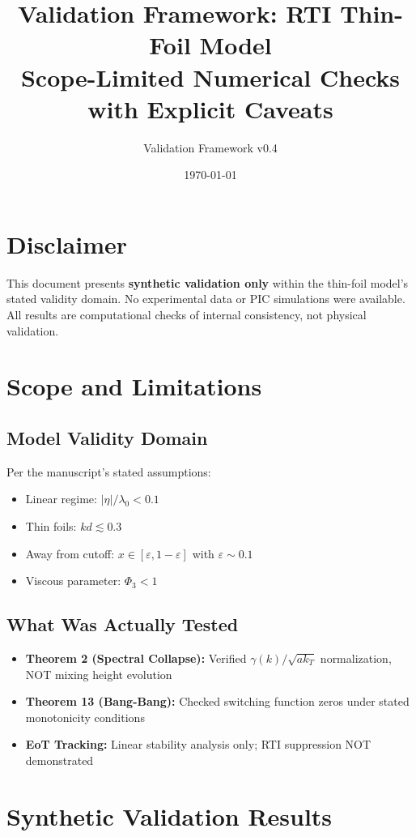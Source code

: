 \documentclass[11pt]{article}
\title{Validation Framework: RTI Thin-Foil Model\\[2pt]
\large Scope-Limited Numerical Checks with Explicit Caveats}
\author{Validation Framework v0.4}
\date{\today}
\begin{document}
\maketitle

\section*{Disclaimer}

This document presents \textbf{synthetic validation only} within the thin-foil model's stated validity domain. No experimental data or PIC simulations were available. All results are computational checks of internal consistency, not physical validation.

\section{Scope and Limitations}

\subsection{Model Validity Domain}
Per the manuscript's stated assumptions:
\begin{itemize}
    \item Linear regime: $|\eta|/\lambda_0 < 0.1$
    \item Thin foils: $kd \lesssim 0.3$
    \item Away from cutoff: $x \in [\varepsilon, 1-\varepsilon]$ with $\varepsilon \sim 0.1$
    \item Viscous parameter: $\Phi_3 < 1$
\end{itemize}

\subsection{What Was Actually Tested}
\begin{itemize}
    \item \textbf{Theorem 2 (Spectral Collapse):} Verified $\gamma(k)/\sqrt{ak_T}$ normalization, NOT mixing height evolution
    \item \textbf{Theorem 13 (Bang-Bang):} Checked switching function zeros under stated monotonicity conditions
    \item \textbf{EoT Tracking:} Linear stability analysis only; RTI suppression NOT demonstrated
\end{itemize}

\section{Synthetic Validation Results}
\end{document}
